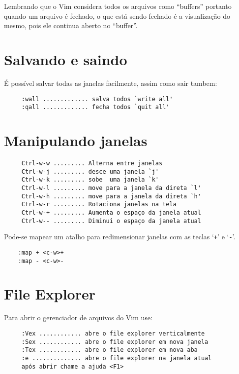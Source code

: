 {\Large {}} Lembrando que o Vim considera todos os arquivos como ``buffers''
portanto quando um arquivo é fechado, o que está sendo fechado é a visualização
do mesmo, pois ele continua aberto no ``buffer''.


\section{Salvando e saindo}
É possível salvar todas as janelas facilmente, assim como sair tambem:

\begin{verbatim}
     :wall ............. salva todos `write all'
     :qall ............. fecha todos `quit all'
\end{verbatim}


\section{Manipulando janelas }

\begin{verbatim}
     Ctrl-w-w ......... Alterna entre janelas
     Ctrl-w-j ......... desce uma janela `j'
     Ctrl-w-k ......... sobe  uma janela `k'
     Ctrl-w-l ......... move para a janela da direta `l'
     Ctrl-w-h ......... move para a janela da direta `h'
     Ctrl-w-r ......... Rotaciona janelas na tela
     Ctrl-w-+ ......... Aumenta o espaço da janela atual
     Ctrl-w-- ......... Diminui o espaço da janela atual
\end{verbatim}

Pode-se mapear um atalho para redimensionar janelas com as teclas `\verb|+|' e `\verb|-|'.

\begin{verbatim}
    :map + <c-w>+
    :map - <c-w>-
\end{verbatim}

\section{File Explorer }
\label{File Explorer }
Para abrir o gerenciador de arquivos do Vim use:

\begin{verbatim}
     :Vex ............ abre o file explorer verticalmente
     :Sex ............ abre o file explorer em nova janela
     :Tex ............ abre o file explorer em nova aba
     :e .............. abre o file explorer na janela atual
     após abrir chame a ajuda <F1>
\end{verbatim}

